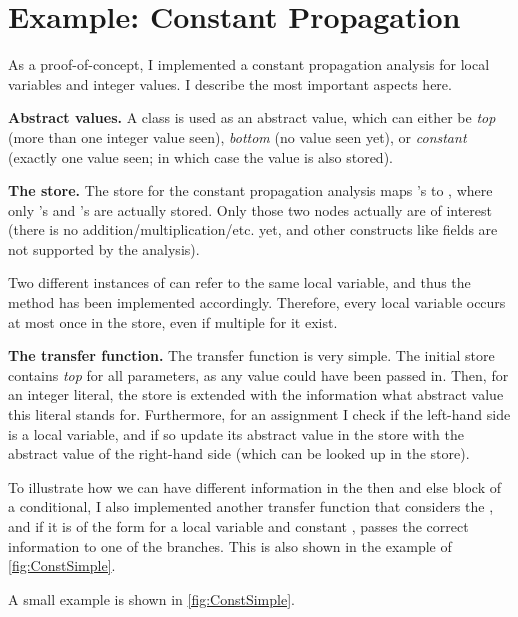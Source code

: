 \section{Example: Constant Propagation}

\begin{workinprogress}
    As a proof-of-concept, I implemented a constant propagation analysis for local variables
    and integer values. I describe the most important aspects here.
    
    \textbf{Abstract values.} A class  is used as an abstract value, which can
    either be \emph{top} (more than one integer value seen), \emph{bottom} (no value seen yet),
    or \emph{constant} (exactly one value seen; in which case the value is also stored).
    
    \textbf{The store.} The store for the constant propagation analysis maps 's to ,
    where only 's and 's are actually stored. Only those
    two nodes actually are of interest (there is no addition/multiplication/etc. yet, and other constructs like
    fields are not supported by the analysis).
    
    Two different instances of  can refer to the same local variable, and thus
    the  method has been implemented accordingly. Therefore, every local variable occurs
    at most once in the store, even if multiple  for it exist.
    
    \textbf{The transfer function.} The transfer function is very simple. The initial store contains
    \emph{top} for all parameters, as any value could have been passed in. Then, for
    an integer literal, the store is extended with the information what abstract value this literal
    stands for. Furthermore, for an assignment I check if the left-hand side is
    a local variable, and if so update its abstract value in the
    store with the abstract value of the right-hand side (which can be looked up in the store).
    
    To illustrate how we can have different information in the then and else block of a conditional,
    I also implemented another transfer function that considers the , and if
    it is of the form  for a local variable  and constant , passes
    the correct information to one of the branches. This is also shown in the example of \autoref{fig:ConstSimple}.
    
     A small example is shown in \autoref{fig:ConstSimple}.
\end{workinprogress}

